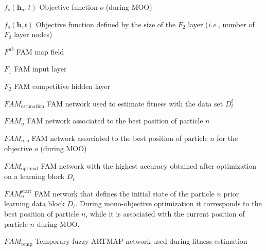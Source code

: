 \documentclass[letterpaper, twoside, 12pt,these,creativecommons,hyperref]{thETS}
\begin{document}
\begin{listofsymbols}[3cm]
\item [$f_o(\textbf{h}_n,t)$] Objective function $o$ (during MOO)
\item [$f_s(\mathbf{h},t)$] Objective function defined by the size of the $F_2$ layer (\emph{i.e.}, number of $F_2$ layer nodes)
\item [$F^{ab}$] FAM map field
\item [$F_1$] FAM input layer
\item [$F_2$] FAM competitive hidden layer
\item [$\textit{FAM}_\text{estimation}$] FAM network used to estimate fitness with the data set $D_t^\text{f}$
\item [$\textit{FAM}_n$] FAM network associated to the best position of particle $n$
\item [$\textit{FAM}_{n,o}$] FAM network associated to the best position of particle $n$ for the objective $o$ (during MOO)
\item [$\textit{FAM}_\text{optimal}$] FAM network with the highest accuracy obtained after optimization on a learning block $D_t$
\item [$\textit{FAM}_n^\text{start}$] FAM network that defines the initial state of the particle $n$ prior learning data block $D_t$. During mono-objective optimization it corresponds to the best position of particle $n$, while it is associated with the current position of particle $n$ during MOO.
\item [$\textit{FAM}_\text{temp}$] Temporary fuzzy ARTMAP network used during fitness estimation

\end{listofsymbols}

\cleardoublepage


\reversemarginpar %
\end{document}
